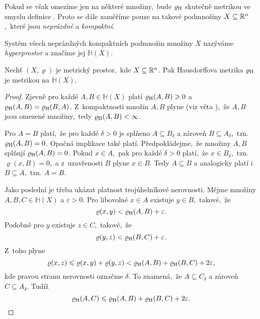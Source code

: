 Pokud se však omezíme jen na některé množiny,~bude $\varrho_\textup{H}$ skutečně metrikou ve smyslu definice . Proto se dále zaměříme pouze na takové podmnožiny $X\subseteq\mathbb{R}^n$,~které jsou \emph{neprázdné} a \emph{kompaktní}.
\begin{definition}[Hyperprostor]\label{def:hyperprostor}
    Systém všech neprázdných kompaktních podmnožin množiny $X$ nazýváme \emph{hyperprostor} a značíme jej $\mathbb{H}(X)$.
\end{definition}
\begin{theorem}\label{thm:hausdorffova-metrika-je-metrika}
    Nechť $(X,\varrho)$ je metrický prostor,~kde $X\subseteq\mathbb{R}^n$. Pak Hausdorffova metrika $\varrho_\textup{H}$ je metrikou na $\mathbb{H}(X)$.
\end{theorem}
\begin{proof}
    Zjevně pro každé $A,B\in\mathbb{H}(X)$ platí $\varrho_\textup{H}(A,B)\geqslant 0$ a $\varrho_\textup{H}(A,B)=\varrho_\textup{H}(B,A)$. Z~kompaktnosti množin $A,B$ plyne (viz věta ),~že $A,B$ jsou omezené množiny,~tedy $\varrho_\textup{H}(A,B)<\infty$.
    
    Pro $A=B$ platí,~že pro každé $\delta>0$ je splňeno $A\subseteq B_\delta$ a zároveň $B\subseteq A_\delta$,~tzn. $\varrho_\textup{H}(A,B)=0$. Opačná implikace také platí. Předpokládejme,~že množiny $A,B$ splňují $\varrho_\textup{H}(A,B)=0$. Pokud $x\in A$,~pak pro každé $\delta>0$ platí,~že $x\in B_\delta$,~tzn. $\varrho(x,B)=0$,~a z~uzavřenosti $B$ plyne $x\in B$. Tedy $A\subseteq B$ a analogicky platí i~$B\subseteq A$,~tzn. $A=B$.

    Jako poslední je třeba ukázat platnost trojúhelníkové nerovnosti. Mějme množiny $A,B,C\in\mathbb{H}(X)$ a $\varepsilon>0$. Pro libovolné $x\in A$ existuje $y\in B$,~takové,~že
    \[\varrho(x,y)<\varrho_\textup{H}(A,B)+\varepsilon.\]
    Podobně pro $y$ existuje $z\in C$,~takové,~že
    \[\varrho(y,z)<\varrho_\textup{H}(B,C)+\varepsilon.\]
    Z~toho plyne
    \[\varrho(x,z)\leqslant\varrho(x,y)+\varrho(y,z)<\varrho_\textup{H}(A,B)+\varrho_\textup{H}(B,C)+2\varepsilon,\]
    kde pravou stranu nerovnosti označme $\delta$. To znamená,~že $A\subseteq C_\delta$ a zároveň $C\subseteq A_\delta$. Tudíž
    \[\varrho_\textup{H}(A,C)\leqslant\varrho_\textup{H}(A,B)+\varrho_\textup{H}(B,C)+2\varepsilon.\]
\end{proof}
